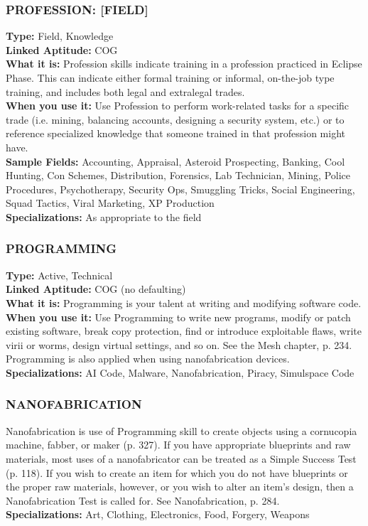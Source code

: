 \subsubsection{PROFESSION: [FIELD]} \textbf{Type:} Field, Knowledge \\ \textbf{Linked Aptitude:} COG \\ \textbf{What it is:} Profession skills indicate training in a profession practiced in Eclipse Phase. This can indicate either formal training or informal, on-the-job type training, and includes both legal and extralegal trades. \\ \textbf{When you use it:} Use Profession to perform work-related tasks for a specific trade (i.e. mining, balancing accounts, designing a security system, etc.) or to reference specialized knowledge that someone trained in that profession might have. \\ \textbf{Sample Fields:} Accounting, Appraisal, Asteroid Prospecting, Banking, Cool Hunting, Con Schemes, Distribution, Forensics, Lab Technician, Mining, Police Procedures, Psychotherapy, Security Ops, Smuggling Tricks, Social Engineering, Squad Tactics, Viral Marketing, XP Production \\ \textbf{Specializations:} As appropriate to the field 

\subsubsection{PROGRAMMING} \textbf{Type:} Active, Technical \\ \textbf{Linked Aptitude:} COG (no defaulting) \\ \textbf{What it is:} Programming is your talent at writing and modifying software code. \\ \textbf{When you use it:} Use Programming to write new programs, modify or patch existing software, break copy protection, find or introduce exploitable flaws, write virii or worms, design virtual settings, and so on. See the Mesh chapter, p. 234. Programming is also applied when using nanofabrication devices. \\ \textbf{Specializations:} AI Code, Malware, Nanofabrication, Piracy, Simulspace Code 

\subsubsection{NANOFABRICATION} Nanofabrication is use of Programming skill to create objects using a cornucopia machine, fabber, or maker (p. 327). If you have appropriate blueprints and raw materials, most uses of a nanofabricator can be treated as a Simple Success Test (p. 118). If you wish to create an item for which you do not have blueprints or the proper raw materials, however, or you wish to alter an item’s design, then a Nanofabrication Test is called for. See Nanofabrication, p. 284. \\ \textbf{Specializations:} Art, Clothing, Electronics, Food, Forgery, Weapons 


